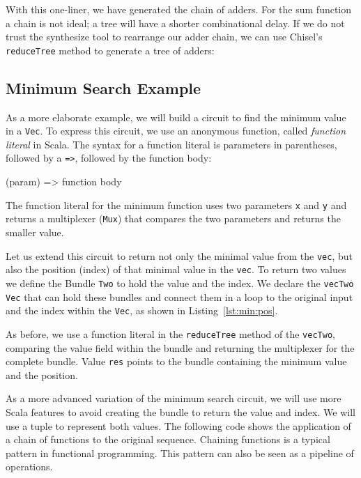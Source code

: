 \documentclass[%
    10pt,
    headinclude, footinclude=false,
    openright, %
    notitlepage,
    cleardoublepage=empty,
    headsepline,
    numbers=noenddot,
    bibliography=totoc, index=totoc,
    ]{scrbook}
\newcommand{\code}[1]{{\lstinline[basicstyle=\small\ttfamily]{#1}}}
\begin{document}

\noindent With this one-liner, we have generated the chain of adders. For the sum function
a chain is not ideal; a tree will have a shorter combinational delay.
If we do not trust the synthesize tool to rearrange our adder chain, we can use Chisel's
\code{reduceTree} method to generate a tree of adders:


\subsection{Minimum Search Example}

As a more elaborate example, we will build a circuit to find the minimum value in a \code{Vec}. To express this circuit,
we use an anonymous function, called \emph{function literal} in Scala.  The syntax for a function
literal is parameters in parentheses, followed by a \code{=>}, followed by the function body:

\begin{chisel}
  (param) => function body
\end{chisel}

The function literal for the minimum function uses two parameters \code{x} and \code{y}
and returns a multiplexer (\code{Mux}) that compares the two parameters and returns the smaller
value.


Let us extend this circuit to return not only the minimal value from the \code{vec}, but also the
position (index) of that minimal value in the \code{vec}. To return two values we define the Bundle \code{Two} to
hold the value and the index. We declare the \code{vecTwo} \code{Vec} that can hold these bundles
and connect them in a loop to the original input and the index within the \code{Vec}, as shown
in Listing~\ref{lst:min:pos}.

As before, we use a function literal in the \code{reduceTree} method of the \code{vecTwo},
comparing the value field within the bundle and returning the multiplexer for the
complete bundle.
Value \code{res} points to the bundle containing the minimum value and the position.



As a more advanced variation of the minimum search circuit, we will use more Scala features
to avoid creating the bundle to return the value
and index. We will use a tuple to represent both values.
The following code shows the application
of a chain of functions to the original sequence. Chaining functions is a typical pattern in functional programming.
This pattern can also be seen as a pipeline of operations.
\end{document}

